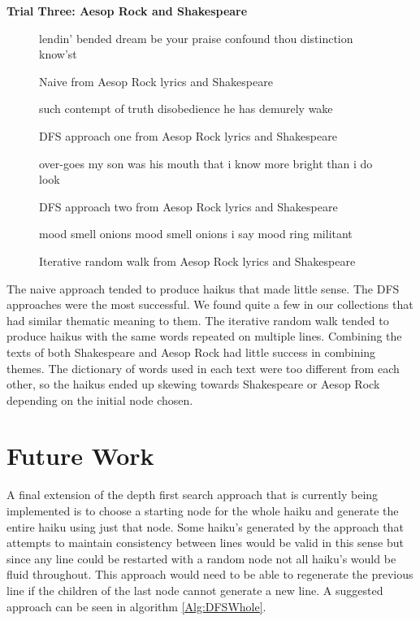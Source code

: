 \documentclass[]{article}
\begin{document}
\begin{center}
	\textbf{Trial Three: Aesop Rock and Shakespeare}	
\end{center}

\begin{figure}[H]
	\centering
	lendin' bended dream \break
	be your praise confound thou \break
	distinction know'st
	\caption{Naive from Aesop Rock lyrics and Shakespeare}
	\label{fig:NaiveAesopShakespeare}
\end{figure}

\begin{figure}[H]
	\centering
	such contempt of truth \break
	disobedience he has \break
	demurely wake
	\caption{DFS approach one from Aesop Rock lyrics and Shakespeare}
	\label{fig:DFSOneAesopShakespeare}
\end{figure}

\begin{figure}[H]
	\centering
	over-goes my son \break
	was his mouth that i know more \break
	bright than i do look
	\caption{DFS approach two from Aesop Rock lyrics and Shakespeare}
	\label{fig:DFSTwoAesopShakespeare}
\end{figure}

\begin{figure}[H]
	\centering
	mood smell onions \break
	mood smell onions i say \break
	mood ring militant
	\caption{Iterative random walk from Aesop Rock lyrics and Shakespeare}
	\label{fig:IRWAesopShakespeare}
\end{figure}

The naive approach tended to produce haikus that made little sense. The DFS approaches were the most successful. We found quite a few in our collections that had similar thematic meaning to them. The iterative random walk tended to produce haikus with the same words repeated on multiple lines. Combining the texts of both Shakespeare and Aesop Rock had little success in combining themes. The dictionary of words used in each text were too different from each other, so the haikus ended up skewing towards Shakespeare or Aesop Rock depending on the initial node chosen.

\section{Future Work}
A final extension of the depth first search approach that is currently being implemented is to choose a starting node for the whole haiku and generate the entire haiku using just that node. Some haiku's generated by the approach that attempts to maintain consistency between lines would be valid in this sense but since any line could be restarted with a random node not all haiku's would be fluid throughout. This approach would need to be able to regenerate the previous line if the children of the last node cannot generate a new line. A suggested approach can be seen in algorithm \ref{Alg:DFSWhole}.
\end{document}

